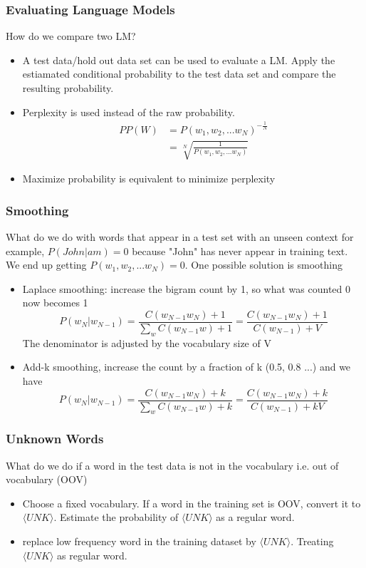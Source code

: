 \documentclass[notheorems, aspectratio=54]{beamer}
\begin{document}
\begin{frame}
\frametitle{Evaluating Language Models}
How do we compare two LM?
\begin{itemize}
\item A test data/hold out data set can be used to evaluate a LM. Apply the estiamated conditional probability to the test data set and compare the resulting probability.
\item Perplexity is used instead of the raw probability. 
\begin{align*}
	PP(W)&=P(w_1, w_2, ...w_N)^{-\frac{1}{N}}\\
	&=\sqrt[N]{\frac{1}{P(w_1, w_2, ...w_N)}}
\end{align*}
\item Maximize probability is equivalent to minimize perplexity

\end{itemize}
\end{frame}

\begin{frame}
\frametitle{Smoothing}
What do we do with words that appear in a test set with an unseen context for example, $P(John|am)=0$ because "John" has never appear in training text. We end up getting $P(w_1, w_2, ...w_N)=0$. One possible solution is smoothing
\begin{itemize}
\item Laplace smoothing: increase the bigram count by 1, so what was counted 0 now becomes 1
$$
P(w_N|w_{N-1})=\frac{C(w_{N-1}w_N)+1}{\sum_{w}C(w_{N-1}w)+1}=\frac{C(w_{N-1}w_N)+1}{C(w_{N-1})+V}
$$
The denominator is adjusted by the vocabulary size of V

\item Add-k smoothing, increase the count by a fraction of k (0.5, 0.8 ...) and we have 
$$
P(w_N|w_{N-1})=\frac{C(w_{N-1}w_N)+k}{\sum_{w}C(w_{N-1}w)+k}=\frac{C(w_{N-1}w_N)+k}{C(w_{N-1})+kV}
$$
\end{itemize}

\end{frame}
\begin{frame}
\frametitle{Unknown Words}
What do we do if a word in the test data is not in the vocabulary i.e. out of vocabulary (OOV)
\begin{itemize} 
\item Choose a fixed vocabulary. If a word in the training set is OOV, convert it to $\langle UNK\rangle$. Estimate the probability of $\langle UNK\rangle$ as a regular word.
\item replace low frequency word in the training dataset by $\langle UNK\rangle$. Treating $\langle UNK\rangle$ as regular word.
\end{itemize}

\end{frame}
\end{document}
